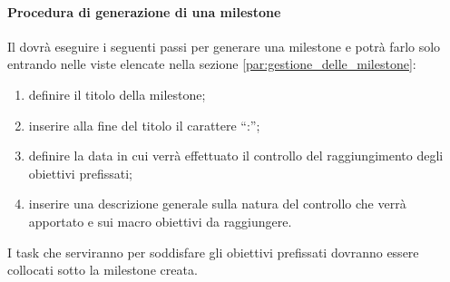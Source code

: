 			\paragraph{Procedura di generazione di una milestone} %
			\label{par:procedura_di_generazione_di_una_milestone}
			Il \roleProjectManager{} dovrà eseguire i seguenti passi per generare una milestone e potrà farlo solo entrando nelle viste elencate nella sezione \ref{par:gestione_delle_milestone}:
				\begin{enumerate}
					\item definire il titolo della milestone;
					\item inserire alla fine del titolo il carattere ``:'';
					\item definire la data in cui verrà effettuato il controllo del raggiungimento degli obiettivi prefissati;
					\item inserire una descrizione generale sulla natura del controllo che verrà apportato e sui macro obiettivi da raggiungere.
				\end{enumerate}
			\noindent
			I task che serviranno per soddisfare gli obiettivi prefissati dovranno essere collocati sotto la milestone creata.

